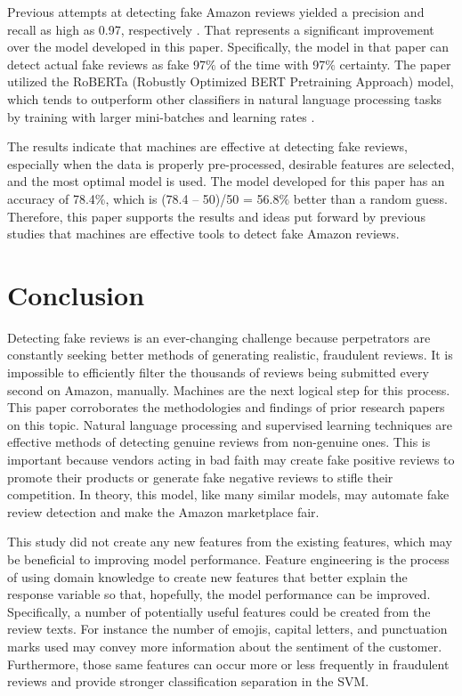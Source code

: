 \documentclass[12pt]{article}
\begin{document}
Previous attempts at detecting fake Amazon reviews yielded a precision and recall as high as 0.97, respectively \citep{Salminen2022}. That represents a significant improvement over the model developed in this paper. Specifically, the model in that paper can detect actual fake reviews as fake 97$\%$ of the time with 97$\%$ certainty. The paper utilized the RoBERTa (Robustly Optimized BERT Pretraining Approach) model, which tends to outperform other classifiers in natural language processing tasks by training with larger mini-batches and learning rates \citep{https://doi.org/10.48550/arxiv.1907.11692}.

The results indicate that machines are effective at detecting fake reviews, especially when the data is properly pre-processed, desirable features are selected, and the most optimal model is used. The model developed for this paper has an accuracy of 78.4$\%$, which is (78.4 – 50)/50 = 56.8$\%$ better than a random guess. Therefore, this paper supports the results and ideas put forward by previous studies that machines are effective tools to detect fake Amazon reviews.

\section{Conclusion}
\label{sec:conclusion}
Detecting fake reviews is an ever-changing challenge because perpetrators are constantly seeking better methods of generating realistic, fraudulent reviews. It is impossible to efficiently filter the thousands of reviews being submitted every second on Amazon, manually. Machines are the next logical step for this process. This paper corroborates the methodologies and findings of prior research papers on this topic. Natural language processing and supervised learning techniques are effective methods of detecting genuine reviews from non-genuine ones. This is important because vendors acting in bad faith may create fake positive reviews to promote their products or generate fake negative reviews to stifle their competition. In theory, this model, like many similar models, may automate fake review detection and make the Amazon marketplace fair.

This study did not create any new features from the existing features, which may be beneficial to improving model performance. Feature engineering is the process of using domain knowledge to create new features that better explain the response variable so that, hopefully, the model performance can be improved. Specifically, a number of potentially useful features could be created from the review texts. For instance the number of emojis, capital letters, and punctuation marks used may convey more information about the sentiment of the customer. Furthermore, those same features can occur more or less frequently in fraudulent reviews and provide stronger classification separation in the SVM. 
\end{document}
